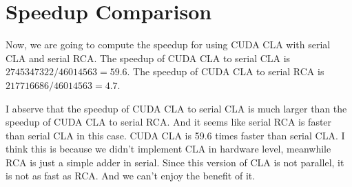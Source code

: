\documentclass[11pt]{article}
\begin{document}
\section{Speedup Comparison}
Now, we are going to compute the speedup for using CUDA CLA with serial CLA and serial RCA. 
The speedup of CUDA CLA to serial CLA is $2745347322 / 46014563 = 59.6$. 
The speedup of CUDA CLA to serial  RCA is $217716686 / 46014563 = 4.7$.

I abserve that the speedup of CUDA CLA to serial CLA is much larger than the speedup of CUDA CLA to serial RCA.
And it seems like serial RCA is faster than serial CLA in this case. CUDA CLA is 59.6 times faster than serial 
CLA. I think this is because we didn't implement CLA in hardware level, meanwhile RCA is just a simple adder in
serial. Since this version of CLA is not parallel, it is not as fast as RCA. And we can't enjoy the benefit of it.
\end{document}
